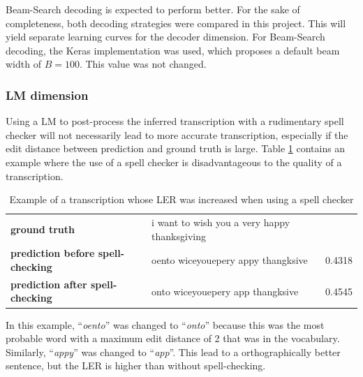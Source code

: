 Beam-Search decoding is expected to perform better. For the sake of completeness, both decoding strategies were compared in this project. This will yield separate learning curves for the decoder dimension. For Beam-Search decoding, the Keras implementation was used, which proposes a default beam width of $B=100$. This value was not changed. 

\subsubsection{\ac{LM} dimension}

Using a \ac{LM} to post-process the inferred transcription with a rudimentary spell checker will not necessarily lead to more accurate transcription, especially if the edit distance between prediction and ground truth is large. Table \ref{lm_bad_example} contains an example where the use of a spell checker is disadvantageous to the quality of a transcription.

\begin{table}[!htbp]
	\centering
	\begin{tabular}{llr}
		\toprule
		 &  & \thead{\ac{LER}} \\
		\midrule
		\textbf{ground truth} & i want to wish you a very happy thanksgiving & \\ 
		\textbf{prediction before spell-checking} & oento wiceyouepery appy thangksive & 0.4318 \\ 
		\textbf{prediction after spell-checking} & onto wiceyouepery app thangksive & 0.4545 \\ 		
		\bottomrule
	\end{tabular}
	\caption{Example of a transcription whose \ac{LER} was increased when using a spell checker}
	\label{lm_bad_example}
\end{table}



In this example, \foreignquote{french}{\textit{oento}} was changed to \foreignquote{french}{\textit{onto}} because this was the most probable word with a maximum edit distance of 2 that was in the vocabulary. Similarly, \foreignquote{french}{\textit{appy}} was changed to \foreignquote{french}{\textit{app}}. This lead to a orthographically better sentence, but the \ac{LER} is higher than without spell-checking. 


